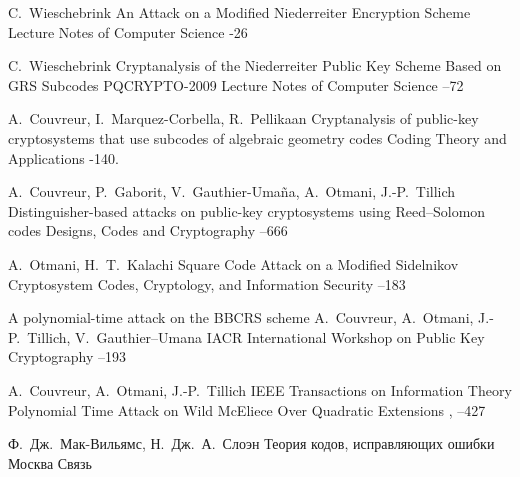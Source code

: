 \begin{thebibliography}{99}
	\by C.~Wieschebrink
	\paper An Attack on a Modified Niederreiter Encryption Scheme
	\jour Lecture Notes of Computer Science
	-26

	\by C.~Wieschebrink
	\paper Cryptanalysis of the Niederreiter Public Key Scheme Based on GRS Subcodes
	\paperinfo PQCRYPTO-2009
	\jour Lecture Notes of Computer Science
	--72

	\by A.~Couvreur, I.~Marquez-Corbella, R.~Pellikaan
	\paper Cryptanalysis of public-key cryptosystems that use subcodes of algebraic geometry codes
	\jour Coding Theory and Applications
	-140.

	\by A.~Couvreur, P.~Gaborit, V.~Gauthier-Uma{\~{n}}a, A.~Otmani, J.-P.~Tillich
	\paper Distinguisher-based attacks on public-key cryptosystems using Reed--Solomon codes
	\jour Designs, Codes and Cryptography
	--666

	\by A.~Otmani, H.~T.~Kalachi
	\paper Square Code Attack on a Modified Sidelnikov Cryptosystem
	\jour Codes, Cryptology, and Information Security
	--183

	\paper A polynomial-time attack on the BBCRS scheme
	\by A.~Couvreur, A.~Otmani, J.-P.~Tillich, V.~Gauthier--Umana
	\paperinfo IACR International Workshop on Public Key Cryptography
	--193

	\by A.~Couvreur, A.~Otmani, J.-P.~Tillich
	\jour IEEE Transactions on Information Theory
	\paper Polynomial Time Attack on Wild McEliece Over Quadratic Extensions
	,
	--427

	\by Ф.~Дж.~Мак-Вильямс, Н.~Дж.~А.~Слоэн
	\book Теория кодов, исправляющих ошибки
	\publaddr Москва
	\publ Связь

\end{thebibliography}